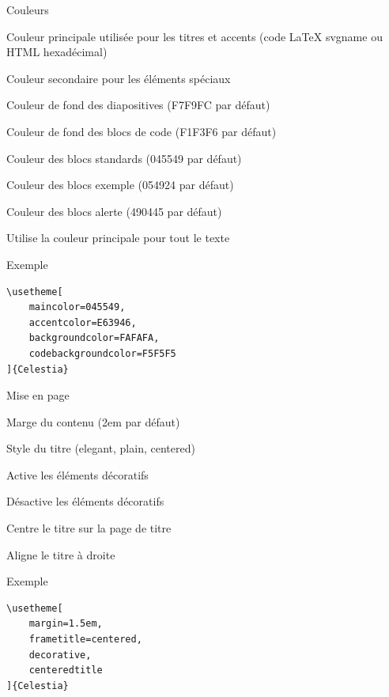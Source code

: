 \documentclass[%
    10pt,
    french,
    aspectratio=1610,
    xcolor=svgnames
]{beamer}
\begin{document}
\begin{frame}[fragile]{Couleurs}
    \begin{description}[codebackgroundcolor]
        \item[maincolor] Couleur principale utilisée pour les titres et accents (code \alert{\LaTeX} svgname ou \alert{HTML} hexadécimal)
        \item[accentcolor] Couleur secondaire pour les éléments spéciaux
        \item[backgroundcolor] Couleur de fond des diapositives (\alert{F7F9FC} par défaut)
        \item[codebackgroundcolor] Couleur de fond des blocs de code (\alert{F1F3F6} par défaut)
        \item[mainblue] Couleur des blocs standards (\alert{045549} par défaut)
        \item[maingreen] Couleur des blocs exemple (\alert{054924} par défaut)
        \item[mainred] Couleur des blocs alerte (\alert{490445} par défaut)
        \item[unicolor] Utilise la couleur principale pour tout le texte
    \end{description}

    \begin{exampleblock}{Exemple}
        \begin{lstlisting}[style=latex]
\usetheme[
    maincolor=045549,
    accentcolor=E63946,
    backgroundcolor=FAFAFA,
    codebackgroundcolor=F5F5F5
]{Celestia}
        \end{lstlisting}
    \end{exampleblock}
\end{frame}

\begin{frame}[fragile]{Mise en page}
    \begin{description}[centeredtitle]
        \item[margin] Marge du contenu (\alert{2em} par défaut)
        \item[frametitle] Style du titre (\alert{elegant}, \alert{plain}, \alert{centered})
        \item[decorative] Active les éléments décoratifs
        \item[nodecorative] Désactive les éléments décoratifs
        \item[centeredtitle] Centre le titre sur la page de titre
        \item[titleright] Aligne le titre à droite
    \end{description}

    \begin{exampleblock}{Exemple}
        \begin{lstlisting}[style=latex]
\usetheme[
    margin=1.5em,
    frametitle=centered,
    decorative,
    centeredtitle
]{Celestia}
        \end{lstlisting}
    \end{exampleblock}
\end{frame}
\end{document}

